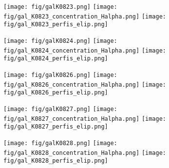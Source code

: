 \begin{figure}[!ht]
\begin{center}
\setcaptionmargin{1cm}
\texttt{[image: fig/galK0823.png]}
\texttt{[image: fig/gal\_K0823\_concentration\_Halpha.png]}
\texttt{[image: fig/gal\_K0823\_perfis\_elip.png]}
\end{center}
\end{figure}


\begin{figure}[!ht]
\begin{center}
\setcaptionmargin{1cm}
\texttt{[image: fig/galK0824.png]}
\texttt{[image: fig/gal\_K0824\_concentration\_Halpha.png]}
\texttt{[image: fig/gal\_K0824\_perfis\_elip.png]}
\end{center}
\end{figure}


\begin{figure}[!ht]
\begin{center}
\setcaptionmargin{1cm}
\texttt{[image: fig/galK0826.png]}
\texttt{[image: fig/gal\_K0826\_concentration\_Halpha.png]}
\texttt{[image: fig/gal\_K0826\_perfis\_elip.png]}
\end{center}
\end{figure}


\begin{figure}[!ht]
\begin{center}
\setcaptionmargin{1cm}
\texttt{[image: fig/galK0827.png]}
\texttt{[image: fig/gal\_K0827\_concentration\_Halpha.png]}
\texttt{[image: fig/gal\_K0827\_perfis\_elip.png]}
\end{center}
\end{figure}


\begin{figure}[!ht]
\begin{center}
\setcaptionmargin{1cm}
\texttt{[image: fig/galK0828.png]}
\texttt{[image: fig/gal\_K0828\_concentration\_Halpha.png]}
\texttt{[image: fig/gal\_K0828\_perfis\_elip.png]}
\end{center}
\end{figure}


